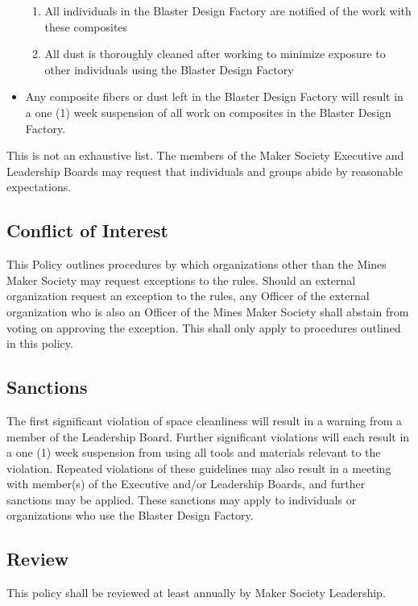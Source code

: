 \documentclass[12pt,letterpaper]{article}
\begin{document}
\begin{itemize}
\begin{enumerate}
        \item All individuals in the Blaster Design Factory are notified of the work with these composites
        \item All dust is thoroughly cleaned after working to minimize exposure to other individuals using the Blaster Design Factory
    \end{enumerate}
    \item Any composite fibers or dust left in the Blaster Design Factory will result in a one (1) week suspension of all work on composites in the Blaster Design Factory.
\end{itemize}

This is not an exhaustive list. The members of the Maker Society Executive and Leadership Boards may request that individuals and groups abide by reasonable expectations.

\subsection{Conflict of Interest}
This Policy outlines procedures by which organizations other than the Mines Maker Society may request exceptions to the rules. Should an external organization request an exception to the rules, any Officer of the external organization who is also an Officer of the Mines Maker Society shall abstain from voting on approving the exception. This shall only apply to procedures outlined in this policy.

\subsection{Sanctions}

The first significant violation of space cleanliness will result in a warning from a member of the Leadership Board. Further significant violations will each result in a one (1) week suspension from using all tools and materials relevant to the violation. Repeated violations of these guidelines may also result in a meeting with member(s) of the Executive and/or Leadership Boards, and further sanctions may be applied. These sanctions may apply to individuals or organizations who use the Blaster Design Factory.

\subsection{Review}

This policy shall be reviewed at least annually by Maker Society Leadership.








    
\end{document}
